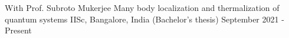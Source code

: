 

\begin{cventries}


\cventry
{With Prof. Subroto Mukerjee} %
{Many body localization and thermalization of quantum systems} %
{IISc, Bangalore, India \space \space\space\space\space\space\space\space\space\space\space(Bachelor's thesis)} %
{September 2021 - Present} %
{
	\begin{cvitems} %
	\end{cvitems}
}

\end{cventries}
